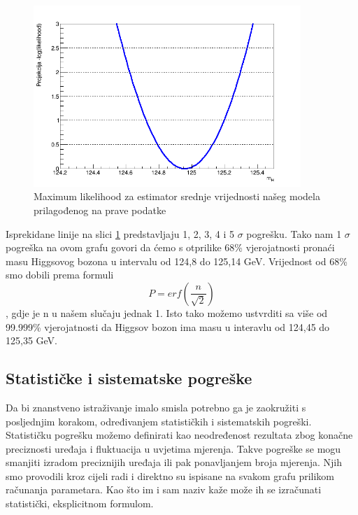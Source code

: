 \documentclass[12pt,a4paper,oneside]{article}
\begin{document}
\begin{linenumbers}
		 \begin{figure}[H]
		 	\centering
		 	\includegraphics[width=0.9\textwidth]{test-23-8.png}
		 	\caption[Saturn viđen u ultraljubičastom svjetlu.]{\label{sl:sl8} Maximum likelihood za estimator srednje vrijednosti našeg modela prilagođenog na prave podatke }
		 \end{figure}
	 	Isprekidane linije na slici \ref{sl:sl8} predstavljaju 1, 2, 3, 4 i 5 $\sigma$ pogrešku. Tako nam 1 $\sigma$ pogreška na ovom grafu govori da ćemo s otprilike 68\% vjerojatnosti pronaći masu Higgsovog bozona u intervalu od 124,8 do 125,14 GeV. Vrijednost od 68\% smo dobili prema formuli \begin{equation}
	 	P=erf(\frac{n}{\sqrt{2}})
	 	\end{equation}, gdje je n u našem slučaju jednak 1.
		Isto tako možemo ustvrditi sa više od 99.999\% vjerojatnosti da Higgsov bozon ima masu u interavlu od 124,45 do 125,35 GeV.
		
		\subsection{Statističke i sistematske pogreške}
		Da bi znanstveno istraživanje imalo smisla potrebno ga je zaokružiti s posljednjim korakom, određivanjem statističkih i sistematskih pogreški.
		Statističku pogrešku možemo definirati kao neodređenost rezultata zbog konačne preciznosti uređaja i fluktuacija u uvjetima mjerenja. Takve pogreške se mogu smanjiti izradom preciznijih uređaja ili pak ponavljanjem broja mjerenja. Njih smo provodili kroz cijeli radi i direktno su ispisane na svakom grafu prilikom računanja parametara. Kao što im i sam naziv kaže može ih se izračunati statistički, eksplicitnom formulom. 
		

\end{linenumbers}
\end{document}

